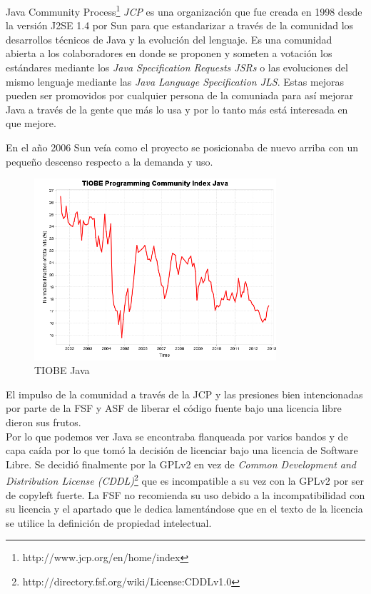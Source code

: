 \documentclass[11pt]{scrartcl}
\begin{document}
Java Community Process\footnote{http://www.jcp.org/en/home/index} \emph{JCP} es una organización que fue creada en 1998 desde la versión J2SE 1.4 por Sun para que estandarizar a través de la comunidad los desarrollos técnicos de Java y la evolución del lenguaje. Es una comunidad abierta a los colaboradores en donde se proponen y someten a votación los estándares mediante los \emph{Java Specification Requests JSRs} o las evoluciones del mismo lenguaje mediante las \emph{Java Language Specification JLS}. Estas mejoras pueden ser promovidos por cualquier persona de la comuniada para así mejorar Java a través de la gente que más lo usa y por lo tanto más está interesada en que mejore.

En el año 2006 Sun veía como el proyecto se posicionaba de nuevo arriba con un pequeño descenso respecto a la demanda y uso.

\begin{figure}[H]
  \centering
  \includegraphics[width=0.8\textwidth]{images/history_Java}
  \caption{TIOBE Java}
  \label{fig:tiobejava}
\end{figure}

El impulso de la comunidad a través de la JCP y las presiones bien intencionadas por parte de la FSF y ASF de liberar el código fuente bajo una licencia libre dieron sus frutos.\\
Por lo que podemos ver Java se encontraba flanqueada por varios bandos y de capa caída por lo que tomó la decisión de licenciar bajo una licencia de Software Libre. Se decidió finalmente por la GPLv2 en vez de \emph{Common Development and Distribution License (CDDL)}\footnote{http://directory.fsf.org/wiki/License:CDDLv1.0} que es incompatible a su vez con la GPLv2 por ser de copyleft fuerte. La FSF no recomienda su uso debido a la incompatibilidad con su licencia y el apartado que le dedica lamentándose que en el texto de la licencia se utilice la definición de propiedad intelectual.
\end{document}
